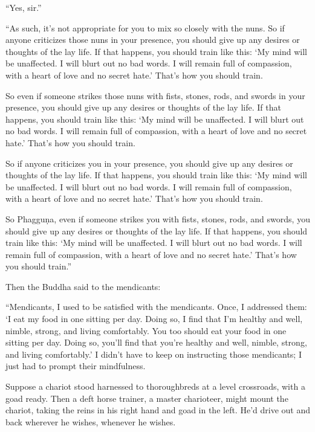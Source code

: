 \documentclass[12pt,openany]{book}%
\begin{document}
“Yes, sir.” 

“As such, it’s not appropriate for you to mix so closely with the nuns. So if anyone criticizes those nuns in your presence, you should give up any desires or thoughts of the lay life. If that happens, you should train like this: ‘My mind will be unaffected. I will blurt out no bad words. I will remain full of compassion, with a heart of love and no secret hate.’ That’s how you should train. 

So even if someone strikes those nuns with fists, stones, rods, and swords in your presence, you should give up any desires or thoughts of the lay life. If that happens, you should train like this: ‘My mind will be unaffected. I will blurt out no bad words. I will remain full of compassion, with a heart of love and no secret hate.’ That’s how you should train. 

So if anyone criticizes you in your presence, you should give up any desires or thoughts of the lay life. If that happens, you should train like this: ‘My mind will be unaffected. I will blurt out no bad words. I will remain full of compassion, with a heart of love and no secret hate.’ That’s how you should train. 

So \textsanskrit{Phagguṇa}, even if someone strikes you with fists, stones, rods, and swords, you should give up any desires or thoughts of the lay life. If that happens, you should train like this: ‘My mind will be unaffected. I will blurt out no bad words. I will remain full of compassion, with a heart of love and no secret hate.’ That’s how you should train.” 

Then the Buddha said to the mendicants: 

“Mendicants, I used to be satisfied with the mendicants. Once, I addressed them: ‘I eat my food in one sitting per day. Doing so, I find that I’m healthy and well, nimble, strong, and living comfortably. You too should eat your food in one sitting per day. Doing so, you’ll find that you’re healthy and well, nimble, strong, and living comfortably.’ I didn’t have to keep on instructing those mendicants; I just had to prompt their mindfulness. 

Suppose a chariot stood harnessed to thoroughbreds at a level crossroads, with a goad ready. Then a deft horse trainer, a master charioteer, might mount the chariot, taking the reins in his right hand and goad in the left. He’d drive out and back wherever he wishes, whenever he wishes. 
\end{document}
